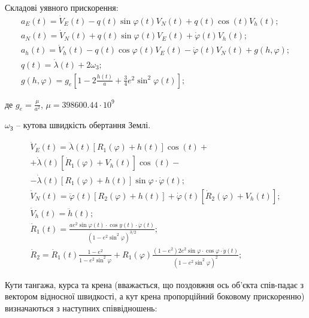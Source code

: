 Складові уявного прискорення:
\begin{equation}
\label{emu_path_acc} 
\begin{array}{l} 
{a_{E}(t)=\dot{V}_{E} (t)-q(t)\sin \varphi (t)V_{N} (t)+q(t)\cos (t)V_{h} (t);} \\ 
{a_{N}(t)=\dot{V}_{N} (t)+q(t)\sin \varphi (t)V_{E} (t)+\dot{\varphi }(t)V_{h} (t);} \\ 
{a_{h}(t)=\dot{V}_{h} (t)-q(t)\cos \varphi (t)V_{E} (t)-\dot{\varphi }(t)V_{N} (t)+g(h,\varphi);} \\ 
{q(t)=\dot{\lambda }(t)+2\omega_{3} ;} \\ 
{g(h,\varphi)=g_{e} [1-2\frac{h(t)}{a} +\frac{3}{4} e^{2} \sin ^{2} \varphi (t)];} 
\end{array}
\end{equation}
\begin{ESKDexplanation}
\item де $g_{e} =\frac{\mu }{a^{2} }$, $\mu =398600.44\cdot 10^{9} $
\item $\omega_{\text{З}} $ -- кутова швидкість обертання Землі.
\end{ESKDexplanation}
\begin{equation}
\label{emu_path_dv} 
\begin{array}{l} 
{\dot{V}_{E} (t)=\ddot{\lambda}(t)[R_{1}(\varphi)+h(t)]\cos (t)+}\\
{+\dot{\lambda}(t)[\dot{R}_{1}(\varphi )+V_{h} (t)]\cos(t)-}\\
{-\dot{\lambda}(t)[R_{1} (\varphi )+h(t)]\sin \varphi \cdotp \dot{\varphi}(t);} \\ 
{\dot{V}_{N}(t)=\ddot{\varphi}(t)[R_{2}(\varphi )+h(t)]+\dot{\varphi}(t)[\dot{R}_{2} (\varphi )+V_{h}(t)];} \\ 
{\dot{V}_{h}(t)=\ddot{h}(t);} \\ 
{\dot{R}_{1} (t)=\frac{ae^{2} \sin \varphi (t)\cdot \cos y(t)\cdot \dot{\varphi }(t)}{(1-e^{2} \sin ^{2} \varphi)^{3/2}};}\\ 
{\dot{R}_{2} =\dot{R}_{1} (t)\frac{1-e^{2} }{1-e^{2} \sin ^{2} \varphi} +R_{1} (\varphi)\frac{(1-e^{2} )2e^{2} \sin \varphi \cdot \cos \varphi \cdot \dot{y}(t)}{(1-e^{2} \sin ^{2} \varphi )^{2}} ;} 

\end{array}
\end{equation} 

Кути тангажа, курса та крена (вважається, що поздовжня ось об’єкта спів-падає з вектором відносної швидкості, а кут крена пропорційний боковому прискоренню) визначаються з наступних співвідношень:

